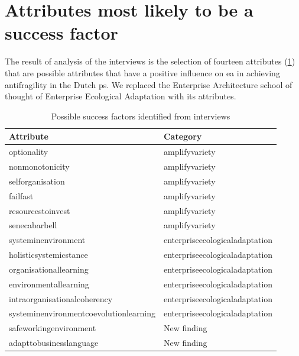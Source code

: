 \section{Attributes most likely to be a success factor}
\label{sec:attributeslikelysf}
The result of analysis of the interviews is the selection of fourteen attributes (\cref{tab:interviewpossiblesf}) that are possible attributes that have a positive influence on \gls{ea} in achieving \gls{antifragility} in the Dutch \gls{ps}. We replaced the Enterprise Architecture school of thought of Enterprise Ecological Adaptation with its \glspl{attribute}.
\begin{longtable}{@{}ll@{}}
	\toprule%
	\textbf{Attribute} & \textbf{Category}  \\%
	\midrule%
	\endhead%
	\hline
	\endfoot%
	\caption[Possible success factors identified from interviews]{Possible success factors identified from interviews}
	\label{tab:interviewpossiblesf}
	\endlastfoot%
	\Gls{optionality} & \Gls{amplifyvariety} \\%
	\Gls{nonmonotonicity} & \Gls{amplifyvariety} \\%
	\Gls{selforganisation} & \Gls{amplifyvariety} \\%
	\Gls{failfast} & \Gls{amplifyvariety} \\%
	\Gls{resourcestoinvest} & \Gls{amplifyvariety} \\%
	\Gls{senecabarbell} & \Gls{amplifyvariety} \\%
	\Gls{systeminenvironment} & \Gls{enterpriseecologicaladaptation} \\%
	\Gls{holisticsystemicstance} & \Gls{enterpriseecologicaladaptation} \\%
	\Gls{organisationallearning} & \Gls{enterpriseecologicaladaptation} \\%
	\Gls{environmentallearning} & \Gls{enterpriseecologicaladaptation} \\%
	\Gls{intraorganisationalcoherency} & \Gls{enterpriseecologicaladaptation} \\%
	\Gls{systeminenvironmentcoevolutionlearning} & \Gls{enterpriseecologicaladaptation} \\%
	\Gls{safeworkingenvironment} & New finding \\%
	\Gls{adapttobusinesslanguage} & New finding \\%
	\bottomrule%
\end{longtable}%
